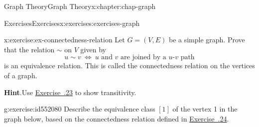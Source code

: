\documentclass[oneside,10pt,]{book}
\newcommand{\blocktitlefont}{\relax}
\newcommand{\xreffont}{\relax}
\numberwithin{equation}{section}
\begin{document}
\begin{chapterptx}{Graph Theory}{}{Graph Theory}{}{}{x:chapter:chap-graph}
\begin{exercises-section}{Exercises}{}{Exercises}{}{}{x:exercises:exercises-graph}
\begin{divisionexercise}{24}{}{}{x:exercise:ex-connectedness-relation}
Let \(G = (V,E)\) be a simple graph. Prove that the relation \(\sim\) on \(V\) given by%
\begin{equation*}
u \sim v \ \Leftrightarrow \ \text{$u$ and $v$ are joined by a $u$-$v$ path}
\end{equation*}
is an equivalence relation. This is called the connectedness relation on the vertices of a graph.%
\par\smallskip%
\noindent\textbf{\blocktitlefont Hint}.\hypertarget{g:hint:id552081}{}\quad{}Use \hyperlink{x:exercise:ex-path-transitive}{Exercise~{\xreffont 5.8.23}} to show transitivity.%
\end{divisionexercise}%
\begin{divisionexercise}{25}{}{}{g:exercise:id552080}%
Describe the equivalence class \([1]\) of the vertex 1 in the graph below, based on the connectedness relation defined in \hyperlink{x:exercise:ex-connectedness-relation}{Exercise~{\xreffont 5.8.24}}.%
\begin{sidebyside}{1}{0.38}{0.38}{0}%
\begin{sbspanel}{0.24}%
\end{sbspanel}
\end{sidebyside}
\end{divisionexercise}
\end{exercises-section}
\end{chapterptx}
\end{document}
